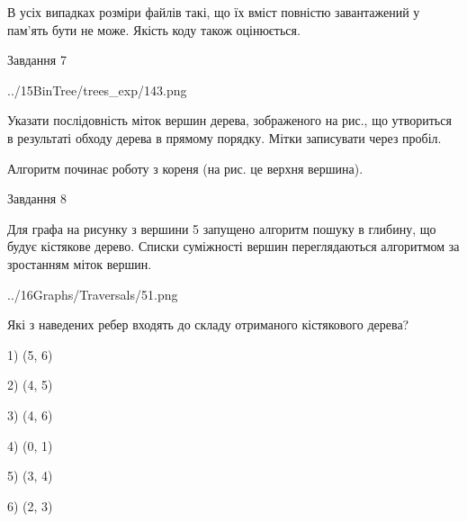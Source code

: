 \documentclass[12pt, ukrainian]{article}
\begin{document}
{В усіх випадках розміри файлів такі, що їх вміст повністю завантажений у пам'ять бути не може. Якість коду також оцінюється.



\vspace{10mm}\par

\newpage
\begin{minipage}[t]{9.7cm}
               
{\begin{center}Завдання {7}\end{center}}
\vspace{-4mm}

\begin{center}
	{../15BinTree/trees_exp/143.png}
\end{center}
Указати послідовність міток вершин дерева, зображеного на рис., що утвориться в результаті обходу дерева в прямому порядку. Мітки записувати через пробіл.\par Алгоритм починає роботу з кореня (на рис. це верхня вершина).\par

\end{minipage}
\vline \hspace{8mm}
\begin{minipage}[t]{8.0cm}
               
{\begin{center}Завдання {8}\end{center}}
\vspace{-4mm}
Для графа на рисунку з вершини 5 запущено алгоритм пошуку в глибину, що будує кістякове дерево. Списки суміжності вершин переглядаються алгоритмом за зростанням міток вершин.\par
\begin{center}
	{../16Graphs/Traversals/51.png}
\end{center}
\par Які з наведених ребер входять до складу отриманого кістякового дерева?\par
1) (5, 6)\par
2) (4, 5)\par
3) (4, 6)\par
4) (0, 1)\par
5) (3, 4)\par
6) (2, 3)\par
{\vskip 15pt} \par


\end{minipage}}
\end{document}
